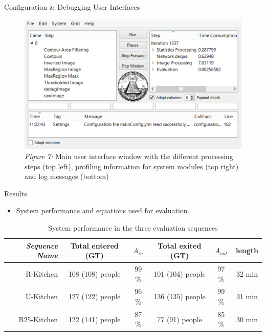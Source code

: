 \documentclass[final,hyperref={pdfpagelabels=false}]{beamer}
\begin{document}
\begin{frame}[t]
\begin{columns}[t]
\begin{column}{.465\textwidth}
\begin{block}{
\vspace*{-0.002\textheight}
Configuration \& Debugging User Interfaces
}
\begin{figure}
\includegraphics[width=0.9\linewidth]{PosterDebuggerLogo.png}
\caption{\centering \textit{Figure 7:} Main user interface window with the different processing steps (top left), profiling information for system modules (top right) and log messages (bottom)}
\end{figure}

\end{block}




\begin{block}{
\vspace*{-0.002\textheight}
Results
}

\begin{itemize}
\item System performance and equations used for evaluation.
\end{itemize}

\begin{table}[h]
\centering
	\begin{tabular}{r | c | c | c | c | c  }
		\emph{Sequence Name}		&  Total entered (GT) & \emph{$A_{in}$} & Total exited (GT) & \emph{$A_{out}$} & length \\
		\hline \hline
		R-Kitchen			& 108 (108) people & 99 \% & 101 (104) people & 97 \% & 32 min\\
		U-Kitchen			& 127 (122) people & 96 \% & 136 (135) people & 99 \% & 31 min  \\
		B25-Kitchen			& 122 (141) people & 87 \% & 77 (91) people & 85 \% & 30 min \\
		\end{tabular}
	\caption{System performance in the three evaluation sequences}
\end{table}




\end{block}
\end{column}
\end{columns}
\end{frame}
\end{document}
